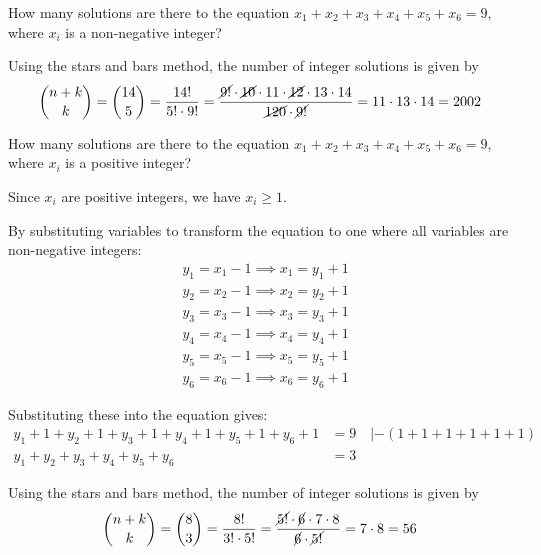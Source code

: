 \documentclass[a4paper,10pt]{article}
\begin{document}
\begin{problem}
	How many solutions are there to the equation $x_{1}+x_{2}+x_{3}+x_{4}+x_{5}+x_{6}=9$, where $x_i$ is a non-negative integer?

	Using the stars and bars method, the number of integer solutions is given by
	\[
		{{n+k}\choose{k}} = {{14}\choose{5}} = \frac{14!}{5! \cdot 9!} = \frac{\cancel{9!} \cdot \cancel{10} \cdot 11 \cdot \cancel{12} \cdot 13 \cdot 14}{\cancel{120} \cdot \cancel{9!}} = 11 \cdot 13 \cdot 14 = 2002
	\]
\end{problem}

\begin{problem}
	How many solutions are there to the equation $x_{1}+x_{2}+x_{3}+x_{4}+x_{5}+x_{6}=9$, where $x_i$ is a positive integer?

	Since $x_i$ are positive integers, we have $x_{i} \geq 1$.

	By substituting variables to transform the equation to one where all variables are non-negative integers:
	\[
		\begin{aligned}
			&y_{1} = x_{1}-1 \implies x_{1} = y_{1}+1 \\
			&y_{2} = x_{2}-1 \implies x_{2} = y_{2}+1 \\
			&y_{3} = x_{3}-1 \implies x_{3} = y_{3}+1 \\
			&y_{4} = x_{4}-1 \implies x_{4} = y_{4}+1 \\
			&y_{5} = x_{5}-1 \implies x_{5} = y_{5}+1 \\
			&y_{6} = x_{6}-1 \implies x_{6} = y_{6}+1
		\end{aligned}
	\]

	Substituting these into the equation gives:
	\[
		\begin{aligned}
			y_{1}+1+y_{2}+1+y_{3}+1+y_{4}+1+y_{5}+1+y_{6}+1 &= 9 \quad | - (1+1+1+1+1+1)\\
			y_{1} + y_{2} + y_{3} + y_{4} + y_{5} + y_{6} &= 3
		\end{aligned}
	\]

	Using the stars and bars method, the number of integer solutions is given by
	\[
		{{n+k}\choose{k}} = {{8}\choose{3}} = \frac{8!}{3! \cdot 5!} = \frac{\cancel{5!} \cdot \cancel6 \cdot 7 \cdot 8}{\cancel6 \cdot \cancel{5!}} = 7 \cdot 8 = 56
	\]
\end{problem}
\end{document}
